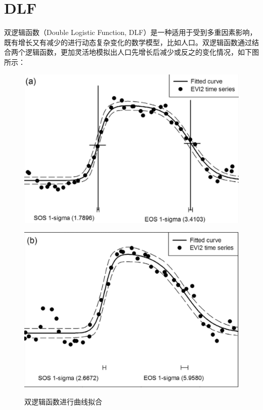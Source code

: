 \section{DLF}
双逻辑函数（Double Logistic Function, DLF）是一种适用于受到多重因素影响，既有增长又有减少的进行动态复杂变化的数学模型，比如人口。双逻辑函数通过结合两个逻辑函数，更加灵活地模拟出人口先增长后减少或反之的变化情况，如下图所示：
\begin{figure}[h]
    \centering
    \begin{minipage}[b]{0.45\textwidth}
        \centering
        \includegraphics[width=\linewidth]{figures/53.png}
  
        \label{fig:first-image}
    \end{minipage}
    \hspace{0.05\textwidth} %
    \begin{minipage}[b]{0.45\textwidth}
        \centering
        \includegraphics[width=\linewidth]{figures/54.png}
        
        \label{fig:second-image}
    \end{minipage}
    \caption{双逻辑函数进行曲线拟合}
\end{figure}

